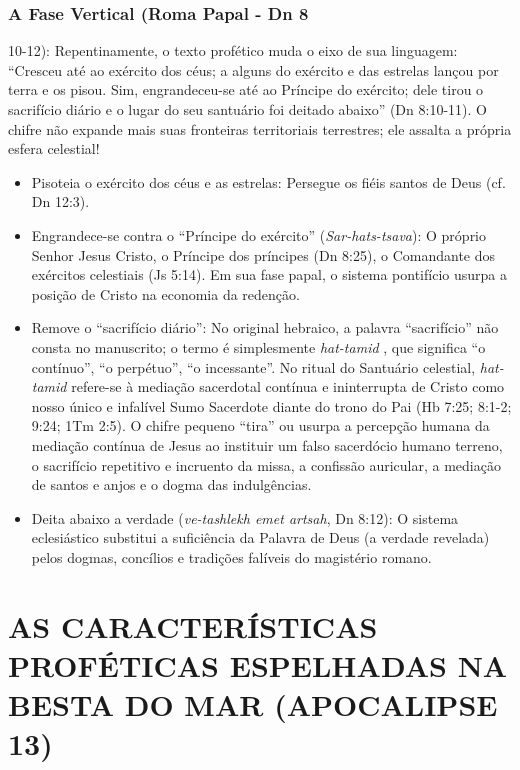 \documentclass[11pt,a4paper,openany]{book}
\begin{document}
\subsubsection*{A Fase Vertical (Roma Papal - Dn 8}
10-12): Repentinamente, o texto profético muda o eixo de sua linguagem: ``Cresceu até ao exército dos céus; a alguns do exército e das estrelas lançou por terra e os pisou. Sim, engrandeceu-se até ao Príncipe do exército; dele tirou o sacrifício diário e o lugar do seu santuário foi deitado abaixo'' (Dn 8:10-11). O chifre não expande mais suas fronteiras territoriais terrestres; ele assalta a própria esfera celestial!
\begin{itemize}
  \item Pisoteia o exército dos céus e as estrelas: Persegue os fiéis santos de Deus (cf. Dn 12:3).
  \item Engrandece-se contra o ``Príncipe do exército'' (\textit{Sar-hats-tsava}): O próprio Senhor Jesus Cristo, o Príncipe dos príncipes (Dn 8:25), o Comandante dos exércitos celestiais (Js 5:14). Em sua fase papal, o sistema pontifício usurpa a posição de Cristo na economia da redenção.
  \item Remove o ``sacrifício diário'': No original hebraico, a palavra ``sacrifício'' não consta no manuscrito; o termo é simplesmente \textit{hat-tamid} , que significa ``o contínuo'', ``o perpétuo'', ``o incessante''. No ritual do Santuário celestial, \textit{hat-tamid} refere-se à mediação sacerdotal contínua e ininterrupta de Cristo como nosso único e infalível Sumo Sacerdote diante do trono do Pai (Hb 7:25; 8:1-2; 9:24; 1Tm 2:5). O chifre pequeno ``tira'' ou usurpa a percepção humana da mediação contínua de Jesus ao instituir um falso sacerdócio humano terreno, o sacrifício repetitivo e incruento da missa, a confissão auricular, a mediação de santos e anjos e o dogma das indulgências.
  \item Deita abaixo a verdade (\textit{ve-tashlekh emet artsah}, Dn 8:12): O sistema eclesiástico substitui a suficiência da Palavra de Deus (a verdade revelada) pelos dogmas, concílios e tradições falíveis do magistério romano.
\end{itemize}




\section{AS CARACTERÍSTICAS PROFÉTICAS ESPELHADAS NA BESTA DO MAR (APOCALIPSE 13)}
\end{document}
